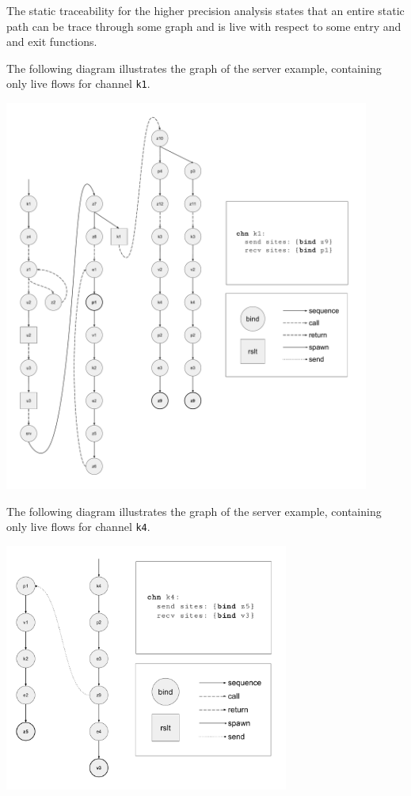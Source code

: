 \documentclass[10pt]{article}
\begin{document}
The static traceability for the higher precision analysis states
that an entire static path can be trace through some graph and
is live with respect to some entry and and exit functions.

\newpage

The following diagram illustrates the graph of the server example,
containing only live flows for channel \lstinline{k1}. \

\includegraphics[width=0.9\textwidth]{cml-graph-k1.pdf}

\newpage

The following diagram illustrates the graph of the server example,
containing only live flows for channel \lstinline{k4}. \

\includegraphics[width=0.7\textwidth]{cml-graph-k4.pdf}
\end{document}
